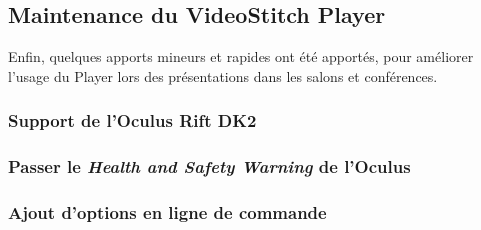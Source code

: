 \subsection{Maintenance du VideoStitch Player}
Enfin, quelques apports mineurs et rapides ont été apportés, pour améliorer l'usage
du Player lors des présentations dans les salons et conférences.
\subsubsection{Support de l'Oculus Rift DK2}

\subsubsection{Passer le \textit{Health and Safety Warning} de l'Oculus}

\subsubsection{Ajout d'options en ligne de commande}


